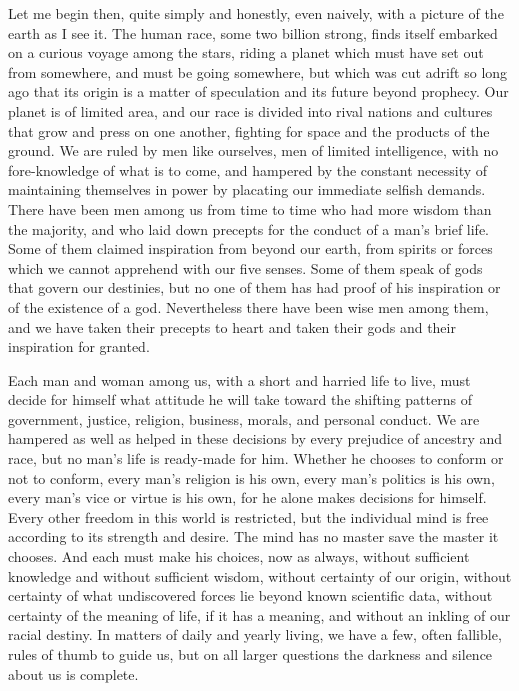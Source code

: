 \documentclass[9pt,twoside]{extarticle}
\begin{document}
Let me begin then, quite simply and honestly, even naively, with a picture of the earth as I see it. The human race, some two billion strong, finds itself embarked on a curious voyage among the stars, riding a planet which must have set out from somewhere, and must be going somewhere, but which was cut adrift so long ago that its origin is a matter of speculation and its future beyond prophecy. Our planet is of limited area, and our race is divided into rival nations and cultures that grow and press on one another, fighting for space and the products of the ground. We are ruled by men like ourselves, men of limited intelligence, with no fore-knowledge of what is to come, and hampered by the constant necessity of maintaining themselves in power by placating our immediate selfish demands. There have been men among us from time to time who had more wisdom than the majority, and who laid down precepts for the conduct of a man's brief life. Some of them claimed inspiration from beyond our earth, from spirits or forces which we cannot apprehend with our five senses. Some of them speak of gods that govern our destinies, but no one of them has had proof of his inspiration or of the existence of a god. Nevertheless there have been wise men among them, and we have taken their precepts to heart and taken their gods and their inspiration for granted.

Each man and woman among us, with a short and harried life to live, must decide for himself what attitude he will take toward the shifting patterns of government, justice, religion, business, morals, and personal conduct. We are hampered as well as helped in these decisions by every prejudice of ancestry and race, but no man's life is ready-made for him. Whether he chooses to conform or not to conform, every man's religion is his own, every man's politics is his own, every man's vice or virtue is his own, for he alone makes decisions for himself. Every other freedom in this world is restricted, but the individual mind is free according to its strength and desire. The mind has no master save the master it chooses. And each must make his choices, now as always, without sufficient knowledge and without sufficient wisdom, without certainty of our origin, without certainty of what undiscovered forces lie beyond known scientific data, without certainty of the meaning of life, if it has a meaning, and without an inkling of our racial destiny. In matters of daily and yearly living, we have a few, often fallible, rules of thumb to guide us, but on all larger questions the darkness and silence about us is complete.
\end{document}
